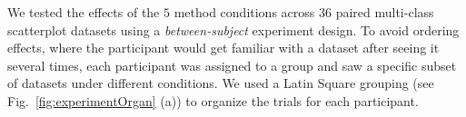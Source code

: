 {%
%
%

\vspace{.3em}
 We tested the effects of the $5$ method conditions across $36$ paired multi-class scatterplot datasets using a \emph{between-subject} experiment design. To avoid ordering effects, where the participant would get familiar with a dataset after seeing it several times, each participant was assigned to a group and saw a specific subset of datasets under different conditions. We used a Latin Square grouping (see Fig.~\ref{fig:experimentOrgan} (a)) to organize the trials for each participant. %

}
